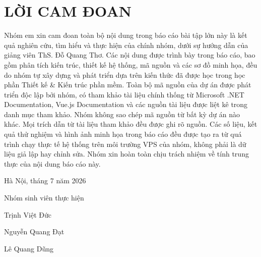 \chapter*{LỜI CAM ĐOAN}

Nhóm em xin cam đoan toàn bộ nội dung trong báo cáo bài tập lớn này là kết quả nghiên cứu, tìm hiểu và thực hiện của chính nhóm, dưới sự hướng dẫn của giảng viên ThS. Đỗ Quang Thơ. Các nội dung được trình bày trong báo cáo, bao gồm phân tích kiến trúc, thiết kế hệ thống, mã nguồn và các sơ đồ minh họa, đều do nhóm tự xây dựng và phát triển dựa trên kiến thức đã được học trong học phần Thiết kế \& Kiến trúc phần mềm. Toàn bộ mã nguồn của dự án được phát triển độc lập bởi nhóm, có tham khảo tài liệu chính thống từ Microsoft .NET Documentation, Vue.js Documentation và các nguồn tài liệu được liệt kê trong danh mục tham khảo. Nhóm không sao chép mã nguồn từ bất kỳ dự án nào khác. Mọi trích dẫn từ tài liệu tham khảo đều được ghi rõ nguồn. Các số liệu, kết quả thử nghiệm và hình ảnh minh họa trong báo cáo đều được tạo ra từ quá trình chạy thực tế hệ thống trên môi trường VPS của nhóm, không phải là dữ liệu giả lập hay chỉnh sửa. Nhóm xin hoàn toàn chịu trách nhiệm về tính trung thực của nội dung báo cáo này.

Hà Nội, tháng 7 năm 2026

Nhóm sinh viên thực hiện

Trịnh Việt Đức

Nguyễn Quang Đạt

Lê Quang Dũng
